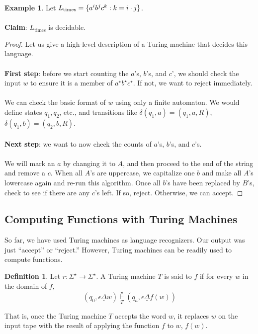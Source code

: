 \documentclass[]{article}
\DeclarePairedDelimiter{\set}{\lbrace}{\rbrace}
\theoremstyle{definition}
\newtheorem*{defn}{Definition}
\newtheorem{ex}{Example}[section]
\begin{document}
      \begin{ex}
        Let $L_\text{times} = \set{a^ib^jc^k : k = i \cdot j}$.
        \\ \\
        \textbf{Claim}: $L_\text{times}$ is decidable.

        \begin{proof}
          Let us give a high-level description of a Turing machine that decides this language.
          \\ \\
          \textbf{First step}: before we start counting the $a$'s, $b$'s, and $c$', we should check the input $w$ to ensure it is a member of $a^\star b^\star c^\star$. If not, we want to reject immediately.
          \\ \\
          We can check the basic format of $w$ using only a finite automaton. We would define states $q_1, q_2$, etc., and transitions like $\delta(q_1, a) = (q_1, a, R)$, $\delta(q_1, b) = (q_2, b, R)$.
          \\ \\
          \textbf{Next step}: we want to now check the counts of $a$'s, $b$'s, and $c$'s.
          \\ \\
          We will mark an $a$ by changing it to $A$, and then proceed to the end of the string and remove a $c$. When all $A$'s are uppercase, we capitalize one $b$ and make all $A$'s lowercase again and re-run this algorithm. Once all $b$'s have been replaced by $B$'s, check to see if there are any $c$'s left. If so, reject. Otherwise, we can accept.
        \end{proof}
      \end{ex}

    \subsection{Computing Functions with Turing Machines}
      So far, we have used Turing machines as language recognizers. Our output was just ``accept'' or ``reject.'' However, Turing machines can be readily used to compute functions.

      \begin{defn}
        Let $r : \Sigma^\star \to \Sigma^\star$. A Turing machine $T$ is said to  $f$ if for every $w$ in the domain of $f$,
        $$
          (q_0, \epsilon \underline{\Delta}w) \underset{T}{\overset{\star}{\vdash}} (q_a, \epsilon \underline{\Delta} f(w))
        $$

        That is, once the Turing machine $T$ accepts the word $w$, it replaces $w$ on the input tape with the result of applying the function $f$ to $w$, $f(w)$.
      \end{defn}
\end{document}
